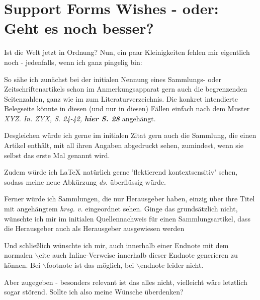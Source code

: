 %
%
%
%
\section{Support Forms Wishes - oder: Geht es noch besser?}
Ist die Welt jetzt in Ordnung? Nun, ein paar Kleinigkeiten fehlen mir
eigentlich noch - jedenfalls, wenn ich ganz pingelig bin:

So sähe ich zunächst bei der initialen Nennung eines Sammlungs- oder
Zeitschriftenartikels schon im Anmerkungsapparat gern auch die begrenzenden
Seitenzahlen, ganz wie im zum Literaturverzeichnis. Die konkret
intendierte Belegseite könnte in diesen (und nur in diesen) Fällen einfach nach
dem Muster {\itshape XYZ. In. ZYX, S. 24-42, {\bfseries hier S. 28}} angehängt.

Desgleichen würde ich gerne im initialen Zitat gern auch die Sammlung, die einen
Artikel enthält, mit all ihren Angaben abgedruckt sehen, zumindest, wenn sie
selbst das erste Mal genannt wird.

Zudem würde ich LaTeX natürlich gerne 'flektierend kontextsensitiv'
sehen, sodass meine neue Abkürzung {\itshape ds.} überflüssig würde.

Ferner würde ich Sammlungen, die nur Herausgeber haben, einzig über ihre Titel
mit angehängtem {\itshape hrsg. v.} eingeordnet sehen. Ginge das grundsätzlich
nicht, wünschte ich mir im initialen Quellennachweis für einen Sammlungsartikel,
dass die Herausgeber auch als Herausgeber ausgewiesen werden 

Und schließlich wünschte ich mir, auch innerhalb einer Endnote mit dem normalen
$\backslash$cite auch Inline-Verweise innerhalb dieser Endnote generieren zu
können. Bei $\backslash$footnote ist das möglich, bei $\backslash$endnote leider
nicht.

Aber zugegeben - besonders relevant ist das alles nicht, vielleicht wäre
letztlich sogar störend. Sollte ich also meine Wünsche überdenken?

%

